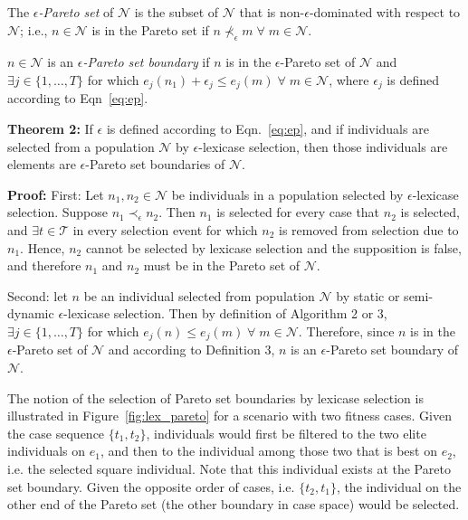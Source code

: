 \documentclass[preprint]{article}
\begin{document}
 The {\it $\epsilon$-Pareto set} of $\mathcal{N}$ is the subset of $\mathcal{N}$ that is non-$\epsilon$-dominated with respect to $\mathcal{N}$; i.e., $n \in \mathcal{N}$ is in the Pareto set if $n \nprec_{\epsilon} m \; \forall \; m \in \mathcal{N}$. 
\bigskip

\medskip
{} $n \in \mathcal{N}$ is an {\it $\epsilon$-Pareto set boundary} if $n$ is in the $\epsilon$-Pareto set of $\mathcal{N}$ and $\exists j \in \{1,\dots,T\}$ for which $e_j(n_1) + \epsilon_j \leq e_j(m) \; \forall \; m \in \mathcal{N}$, where $\epsilon_j$ is defined according to Eqn~\ref{eq:ep}. \bigskip


\medskip
\noindent \textbf{Theorem 2:} If $\epsilon$ is defined according to Eqn.~\ref{eq:ep}, and if individuals are selected from a population $\mathcal{N}$ by $\epsilon$-lexicase selection, then those individuals are elements are $\epsilon$-Pareto set boundaries of $\mathcal{N}$.  
\medskip


\noindent \textbf{Proof:} First: Let $n_1, n_2 \in \mathcal{N}$ be individuals in a population selected by $\epsilon$-lexicase selection. Suppose $n_1 \prec_{\epsilon} n_2$. Then $n_1$ is selected for every case that $n_2$ is selected, and $\exists t \in \mathcal{T}$ in every selection event for which $n_2$ is removed from selection due to $n_1$. Hence, $n_2$ cannot be selected by lexicase selection and the supposition is false, and therefore $n_1$ and $n_2$ must be in the Pareto set of $\mathcal{N}$. 

Second: let $n$ be an individual selected from population $\mathcal{N}$ by static or semi-dynamic $\epsilon$-lexicase selection. Then by definition of Algorithm 2 or 3, $\exists j \in \{1,\dots,T\}$ for which $e_j(n) \leq e_j(m) \; \forall \; m \in \mathcal{N}$. Therefore, since $n$ is in the $\epsilon$-Pareto set of $\mathcal{N}$ and according to Definition 3, $n$ is an $\epsilon$-Pareto set boundary of $\mathcal{N}$.  
\bigskip

The notion of the selection of Pareto set boundaries by lexicase selection is illustrated in Figure~\ref{fig:lex_pareto} for a scenario with two fitness cases. Given the case sequence $\{t_1, t_2\}$, individuals would first be filtered to the two elite individuals on $e_1$, and then to the individual among those two that is best on $e_2$, i.e. the selected square individual. Note that this individual exists at the Pareto set boundary. Given the opposite order of cases, i.e. $\{t_2, t_1\}$, the individual on the other end of the Pareto set (the other boundary in case space) would be selected.   
\end{document}

